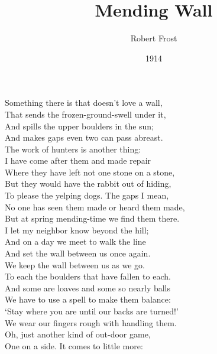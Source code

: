 \documentclass[10pt,twocolumn,a4paper]{article}
\begin{document}
\title{Mending Wall}
\date{1914}
\author{Robert Frost}

\maketitle
    
\linenumbers
\noindent
Something there is that doesn’t love a wall,\\
That sends the frozen-ground-swell under it,\\
And spills the upper boulders in the sun;\\
And makes gaps even two can pass abreast.\\
The work of hunters is another thing:\\
I have come after them and made repair\\
Where they have left not one stone on a stone,\\
But they would have the rabbit out of hiding,\\
To please the yelping dogs. The gaps I mean,\\
No one has seen them made or heard them made,\\
But at spring mending-time we find them there.\\
I let my neighbor know beyond the hill;\\
And on a day we meet to walk the line\\
And set the wall between us once again.\\
We keep the wall between us as we go.\\
To each the boulders that have fallen to each.\\
And some are loaves and some so nearly balls\\
We have to use a spell to make them balance:\\
‘Stay where you are until our backs are turned!’\\
We wear our fingers rough with handling them.\\
Oh, just another kind of out-door game,\\
One on a side. It comes to little more:\\
\end{document}
